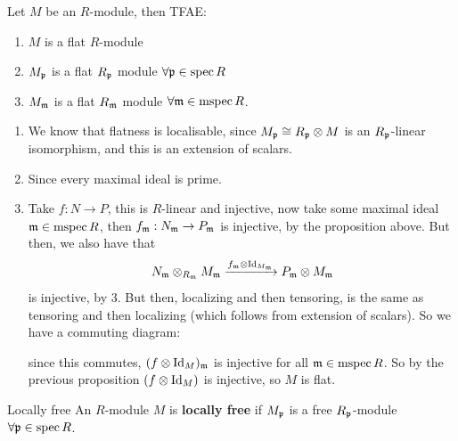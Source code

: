 \documentclass{article}
\begin{document}
\begin{fancyprop}
    Let $M$ be an $R$-module, then TFAE: \begin{enumerate}
        \item $M$ is a flat $R$-module 
        \item $M_{\mathfrak{p}}$ is a flat $R_{\mathfrak{p}}$ module $\forall \mathfrak{p} \in \operatorname{spec} R$
        \item $M_{\mathfrak{m}}$ is a flat $R_{\mathfrak{m}}$ module $\forall \mathfrak{m} \in \operatorname{mspec} R$.
    \end{enumerate}
\end{fancyprop}
\proof\hspace{0.1cm} \begin{enumerate}
    \item[$(1) \Rightarrow (2)$] We know that flatness is localisable, since $M_{\mathfrak{p}} \cong R_{\mathfrak{p}} \otimes M$ is an $R_{\mathfrak{p}}$-linear isomorphism, and this is an extension of scalars.
    \item[$(2) \Rightarrow (3)$] Since every maximal ideal is prime. 
    \item[$(3) \Rightarrow (1)$] Take $f : N \to P$, this is $R$-linear and injective, now take some maximal ideal $\mathfrak{m} \in \operatorname{mspec} R$, then $f_{\mathfrak{m}} : N_{\mathfrak{m}} \to P_{\mathfrak{m}}$ is injective, by the proposition above. But then, we also have that \[ N_{\mathfrak{m}} \otimes_{R_{\mathfrak{m}}} M_{\mathfrak{m}} \xrightarrow{f_{\mathfrak{m}} \otimes \operatorname{Id}_{M_{\mathfrak{m}}}} P_{\mathfrak{m}} \otimes M_{\mathfrak{m}}\] is injective, by 3. But then, localizing and then tensoring, is the same as tensoring and then localizing (which follows from extension of scalars). So we have a commuting diagram:
    \begin{center}
    \end{center} 
    since this commutes, $(f \otimes \operatorname{Id}_{M})_{\mathfrak{m}}$ is injective for all $\mathfrak{m} \in \operatorname{mspec} R$. So by the previous proposition $(f \otimes \operatorname{Id}_{M})$ is injective, so $M$ is flat. \endproof 
\end{enumerate}
\begin{fancydefine}{Locally free}
    An $R$-module $M$ is \textbf{locally free} if $M_{\mathfrak{p}}$ is a free $R_{\mathfrak{p}}$-module $\forall \mathfrak{p} \in \operatorname{spec} R$.
\end{fancydefine}
\end{document}
